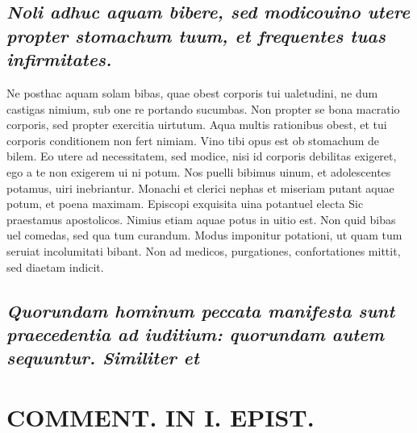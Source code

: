 \documentclass{article}
\begin{document}
\begin{pages}
\subsection*{\textit{Noli adhuc aquam bibere, sed modicouino utere propter stomachum tuum, et frequentes tuas infirmitates. }}\pstart Ne posthac aquam solam bibas, quae obest corporis tui ualetudini, ne dum castigas nimium, sub one re portando sucumbas. Non propter se bona macratio corporis, sed propter exercitia uirtutum. Aqua multis rationibus obest, et tui corporis conditionem non fert nimiam. Vino tibi opus est ob stomachum de bilem. Eo utere ad necessitatem, sed modice, nisi id corporis debilitas exigeret, ego a te non exigerem ui ni potum. Nos puelli bibimus uinum, et adolescentes potamus, uiri inebriantur. Monachi et clerici nephas et miseriam putant aquae potum, et poena maximam. Episcopi exquisita uina potantuel electa Sic praestamus apostolicos. Nimius etiam aquae potus in uitio est. Non quid bibas uel comedas, sed qua tum curandum. Modus imponitur potationi, ut quam tum seruiat incolumitati bibant. Non ad medicos, purgationes, confortationes mittit, sed diaetam indicit.  \pend
{}
{}
\subsection*{\textit{Quorundam hominum peccata manifesta sunt praecedentia ad iuditium: quorundam autem sequuntur. Similiter et }}
\section*{COMMENT. IN I. EPIST. }
\marginpar{[ p.150 ]}
{}

\end{pages}
\end{document}
